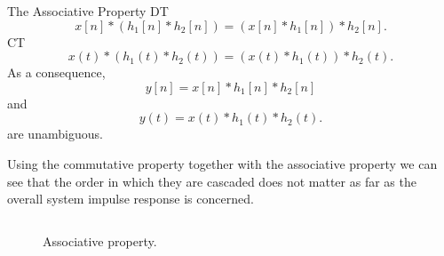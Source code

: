 \begin{frame}{The Associative Property}
    DT
    \begin{equation*}
        x[n]\ast (h_1[n] \ast h_2[n]) = (x[n]\ast h_1[n]) \ast h_2[n].
    \end{equation*}
    CT
    \begin{equation*}
        x(t)\ast (h_1(t) \ast h_2(t)) = (x(t)\ast h_1(t)) \ast h_2(t).
    \end{equation*}
    As a consequence,
    \begin{equation*}
        y[n] = x[n]\ast h_1[n] \ast h_2[n]
    \end{equation*}
    and
    \begin{equation*}
        y(t) = x(t)\ast h_1(t) \ast h_2(t) .
    \end{equation*}
    are unambiguous.\par
    Using the commutative property together with the associative property we can see that the order in which they are cascaded does not matter as far as the overall system impulse response is concerned.

    {
        \begin{columns}
        \end{columns}
    }
\end{frame}


\begin{frame}[plain]
    {
        \begin{figure}
          \centering
          
          \caption{Associative property.}\label{fi:associative_property}
        \end{figure}
    }
\end{frame}


